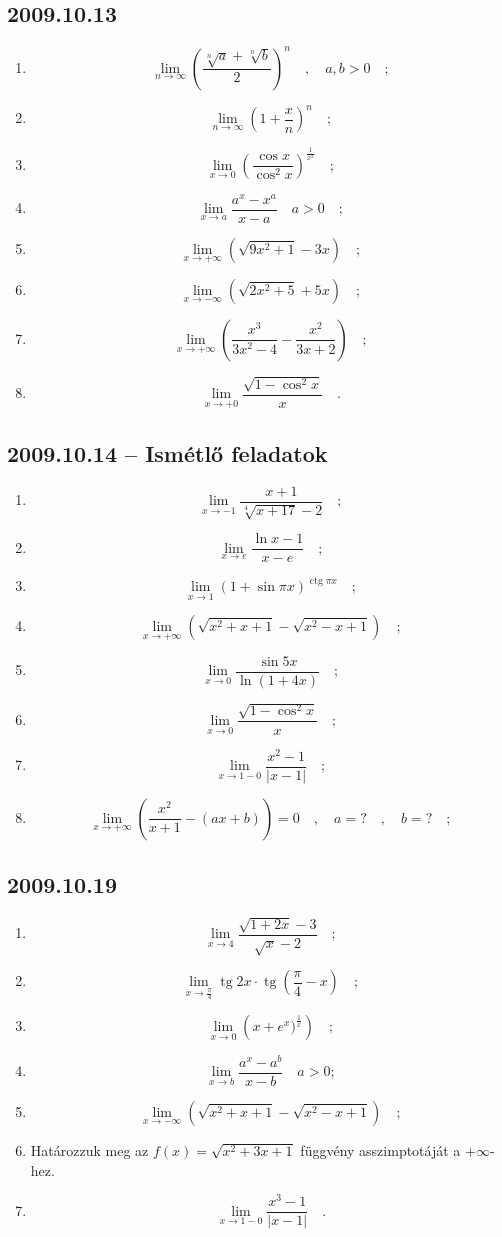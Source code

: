 \documentclass{article}
\newcommand{\tg}{\mathop{\mathrm{tg}}\nolimits}
\newcommand{\ctg}{\mathop{\mathrm{ctg}}\nolimits}
\begin{document}
\subsection*{2009.10.13}
\begin{enumerate}
\item $$\lim_{n\to \infty}\left(\frac{\sqrt[n]{a}+\sqrt[n]{b}}{2}\right)^n\quad,\quad a,b>0\quad;$$
\item $$\lim_{n\to\infty}\left(1+\frac{x}{n}\right)^n\quad;$$
\item $$\lim_{x\to 0}\left(\frac{\cos x}{\cos ^2 x}\right)^{\frac{1}{x^2}}\quad;$$
\item $$\lim_{x\to a}\frac{a^x-x^{a}}{x-a}\quad a>0\quad;$$
\item $$\lim_{x\to +\infty}\left(\sqrt{9x^2+1}-3x\right)\quad;$$
\item $$\lim_{x\to -\infty}\left(\sqrt{2x^2+5}+5x\right)\quad;$$
\item $$\lim_{x\to +\infty}\left(\frac{x^3}{3x^2-4}-\frac{x^2}{3x+2}\right)\quad;$$
\item $$\lim_{x\to+0}\frac{\sqrt{1-\cos ^2x}}{x}\quad.$$
\end{enumerate}
\subsection*{2009.10.14 -- Ismétlő feladatok}
\begin{enumerate}
\item $$\lim_{x\to -1}\frac{x+1}{\sqrt[4]{x+17}-2}\quad;$$
\item $$\lim_{x\to e}\frac{\ln x-1}{x-e}\quad;$$
\item $$\lim_{x\to 1}(1+\sin\pi x)^{\ctg\pi x}\quad;$$
\item $$\lim_{x\to +\infty}\left(\sqrt{x^2+x+1}-\sqrt{x^2-x+1}\right)\quad;$$
\item $$\lim_{x\to 0}\frac{\sin 5x}{\ln(1+4x)}\quad;$$
\item $$\lim_{x\to 0}\frac{\sqrt{1-\cos^2 x}}{x}\quad;$$
\item $$\lim_{x\to 1-0}\frac{x^2-1}{|x-1|}\quad;$$
\item $$\lim_{x\to +\infty}\left(\frac{x^2}{x+1}-(ax+b)\right)=0\quad,\quad a=?\quad,\quad b=?\quad;$$
\end{enumerate}
\subsection*{2009.10.19}
\begin{enumerate}
\item $$\lim_{x\to 4}\frac{\sqrt{1+2x}-3}{\sqrt{x}-2}\quad;$$
\item $$\lim_{x\to\frac{\pi}{4}}\tg 2x\cdot\tg\left(\frac{\pi}{4}-x\right)\quad;$$
\item $$\lim_{x\to 0}\left(x+e^x)^{\frac{1}{x}}\right)\quad;$$
\item $$\lim_{x\to b}\frac{a^x-a^b}{x-b}\quad a>0;$$
\item $$\lim_{x\to -\infty}\left(\sqrt{x^2+x+1}-\sqrt{x^2-x+1}\right)\quad;$$
\item Határozzuk meg az $f(x)=\sqrt{x^2+3x+1}$ függvény asszimptotáját a $+\infty$-hez.
\item $$\lim_{x\to 1-0}\frac{x^3-1}{|x-1|}\quad.$$
\end{enumerate}
\end{document}
